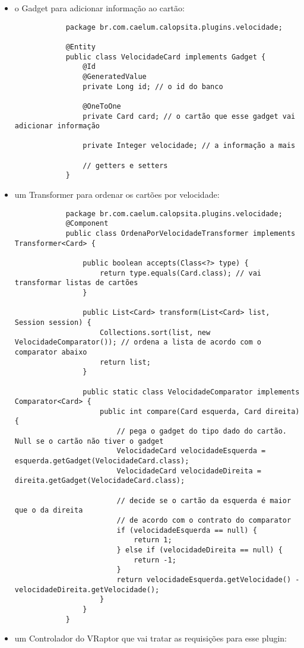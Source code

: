 \begin{itemize}
	\item{o Gadget para adicionar informação ao cartão:
		\begin{lstlisting}
			package br.com.caelum.calopsita.plugins.velocidade;
			
			@Entity
			public class VelocidadeCard implements Gadget {
				@Id
				@GeneratedValue
				private Long id; // o id do banco
				
				@OneToOne
				private Card card; // o cartão que esse gadget vai adicionar informação
				
				private Integer velocidade; // a informação a mais
				
				// getters e setters
			}
		\end{lstlisting}	
	}
	\item{um Transformer para ordenar os cartões por velocidade:
		\begin{lstlisting}
			package br.com.caelum.calopsita.plugins.velocidade;
			@Component
			public class OrdenaPorVelocidadeTransformer implements Transformer<Card> {

				public boolean accepts(Class<?> type) {
					return type.equals(Card.class); // vai transformar listas de cartões
				}

				public List<Card> transform(List<Card> list, Session session) {
					Collections.sort(list, new VelocidadeComparator()); // ordena a lista de acordo com o comparator abaixo
					return list;
				}

				public static class VelocidadeComparator implements Comparator<Card> {
					public int compare(Card esquerda, Card direita) {
						// pega o gadget do tipo dado do cartão. Null se o cartão não tiver o gadget
						VelocidadeCard velocidadeEsquerda = esquerda.getGadget(VelocidadeCard.class); 
						VelocidadeCard velocidadeDireita = direita.getGadget(VelocidadeCard.class);
						
						// decide se o cartão da esquerda é maior que o da direita
						// de acordo com o contrato do comparator
						if (velocidadeEsquerda == null) {
							return 1;
						} else if (velocidadeDireita == null) {
							return -1;
						}
						return velocidadeEsquerda.getVelocidade() - velocidadeDireita.getVelocidade();
					}
				}
			}

		\end{lstlisting}
	}
	
	\item{um Controlador do VRaptor que vai tratar as requisições para esse plugin:
	
}
\end{itemize}
